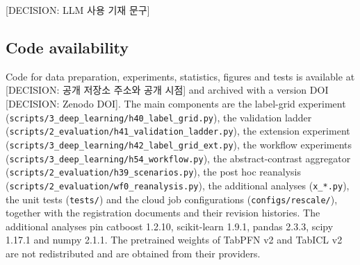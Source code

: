 [DECISION: LLM 사용 기재 문구]

\subsection{Code availability}\label{sec:m-code}

Code for data preparation, experiments, statistics, figures and tests is available at [DECISION: 공개 저장소 주소와 공개 시점] and archived with a version DOI [DECISION: Zenodo DOI]. The main components are the label-grid experiment (\texttt{scripts/3\_deep\_learning/h40\_label\_grid.py}), the validation ladder (\texttt{scripts/2\_evaluation/h41\_validation\_ladder.py}), the extension experiment (\texttt{scripts/3\_deep\_learning/h42\_label\_grid\_ext.py}), the workflow experiments (\texttt{scripts/3\_deep\_learning/h54\_workflow.py}), the abstract-contrast aggregator (\texttt{scripts/2\_evaluation/h39\_scenarios.py}), the post hoc reanalysis (\texttt{scripts/2\_evaluation/wf0\_reanalysis.py}), the additional analyses (\texttt{x\_*.py}), the unit tests (\texttt{tests/}) and the cloud job configurations (\texttt{configs/rescale/}), together with the registration documents and their revision histories. The additional analyses pin catboost 1.2.10, scikit-learn 1.9.1, pandas 2.3.3, scipy 1.17.1 and numpy 2.1.1. The pretrained weights of TabPFN v2 and TabICL v2 are not redistributed and are obtained from their providers.
